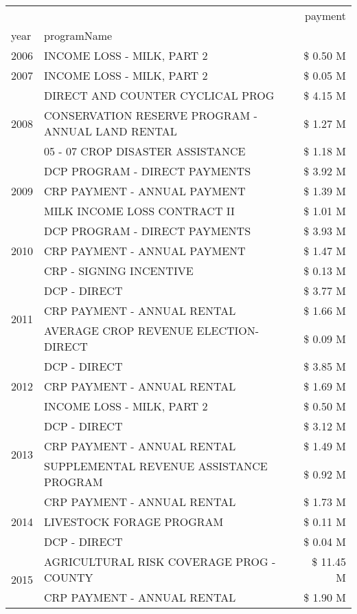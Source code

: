 \begin{tabular}{llr}
\toprule
 &  & payment \\
year & programName &  \\
\midrule
2006 & INCOME LOSS - MILK, PART 2 & \$ 0.50 M \\
\cline{1-3}
2007 & INCOME LOSS - MILK, PART 2 & \$ 0.05 M \\
\cline{1-3}
\multirow[t]{3}{*}{2008} & DIRECT AND COUNTER CYCLICAL PROG & \$ 4.15 M \\
 & CONSERVATION RESERVE PROGRAM - ANNUAL LAND RENTAL & \$ 1.27 M \\
 & 05 - 07 CROP DISASTER ASSISTANCE & \$ 1.18 M \\
\cline{1-3}
\multirow[t]{3}{*}{2009} & DCP PROGRAM - DIRECT PAYMENTS & \$ 3.92 M \\
 & CRP PAYMENT - ANNUAL PAYMENT & \$ 1.39 M \\
 & MILK INCOME LOSS CONTRACT II & \$ 1.01 M \\
\cline{1-3}
\multirow[t]{3}{*}{2010} & DCP PROGRAM - DIRECT PAYMENTS & \$ 3.93 M \\
 & CRP PAYMENT - ANNUAL PAYMENT & \$ 1.47 M \\
 & CRP - SIGNING INCENTIVE & \$ 0.13 M \\
\cline{1-3}
\multirow[t]{3}{*}{2011} & DCP - DIRECT & \$ 3.77 M \\
 & CRP PAYMENT - ANNUAL RENTAL & \$ 1.66 M \\
 & AVERAGE CROP REVENUE ELECTION-DIRECT & \$ 0.09 M \\
\cline{1-3}
\multirow[t]{3}{*}{2012} & DCP - DIRECT & \$ 3.85 M \\
 & CRP PAYMENT - ANNUAL RENTAL & \$ 1.69 M \\
 & INCOME LOSS - MILK, PART 2 & \$ 0.50 M \\
\cline{1-3}
\multirow[t]{3}{*}{2013} & DCP - DIRECT & \$ 3.12 M \\
 & CRP PAYMENT - ANNUAL RENTAL & \$ 1.49 M \\
 & SUPPLEMENTAL REVENUE ASSISTANCE PROGRAM & \$ 0.92 M \\
\cline{1-3}
\multirow[t]{3}{*}{2014} & CRP PAYMENT - ANNUAL RENTAL & \$ 1.73 M \\
 & LIVESTOCK FORAGE PROGRAM & \$ 0.11 M \\
 & DCP - DIRECT & \$ 0.04 M \\
\cline{1-3}
\multirow[t]{3}{*}{2015} & AGRICULTURAL RISK COVERAGE PROG - COUNTY & \$ 11.45 M \\
 & CRP PAYMENT - ANNUAL RENTAL & \$ 1.90 M \\

\end{tabular}
